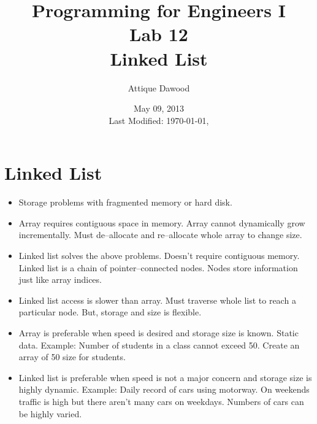 \documentclass[12pt,a4paper]{article}
\title{Programming for Engineers I\\Lab 12\\Linked List}
\author{Attique Dawood}
\date{May 09, 2013\\[0.2cm] Last Modified: \today, \currenttime}
\begin{document}
\maketitle
\section{Linked List}
\begin{itemize}
\item Storage problems with fragmented memory or hard disk.
\item Array requires contiguous space in memory. Array cannot dynamically grow incrementally. Must de--allocate and re--allocate whole array to change size.
\item Linked list solves the above problems. Doesn't require contiguous memory. Linked list is a chain of pointer--connected nodes. Nodes store information just like array indices.
\item Linked list access is slower than array. Must traverse whole list to reach a particular node. But, storage and size is flexible.
\item Array is preferable when speed is desired and storage size is known. Static data. Example: Number of students in a class cannot exceed 50. Create an array of 50 size for students.
\item Linked list is preferable when speed is not a major concern and storage size is highly dynamic. Example: Daily record of cars using motorway. On weekends traffic is high but there aren't many cars on weekdays. Numbers of cars can be highly varied.
\end{itemize}
\end{document}
